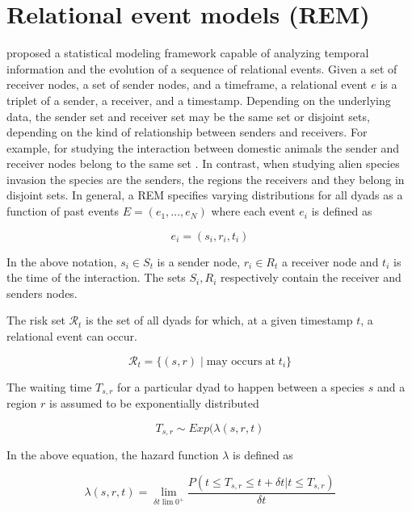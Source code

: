 \documentclass[mscthesis]{usiinfthesis}
\begin{document}
\section{Relational event models (REM)}
\label{background:rem}

\citet{rem:butts} proposed a statistical modeling framework capable of analyzing temporal information and the evolution of a sequence of relational events. Given a set of receiver nodes, a set of sender nodes, and a timeframe, a relational event $e$ is a triplet of a sender, a receiver, and a timestamp. Depending on the underlying data, the sender set and receiver set may be the same set or disjoint sets, depending on the kind of relationship between senders and receivers. For example, for studying the interaction between domestic animals the sender and receiver nodes belong to the same set \cite{intro:cattle}. In contrast, when studying alien species invasion the species are the senders, the regions the receivers and they belong in disjoint sets. In general, a REM specifies varying distributions for all dyads as a function of past events $E=(e_1, ..., e_N)$ where each event $e_i$ is defined as

\[
e_i = (s_i, r_i, t_i)
\]

In the above notation, $s_i \in S_{t} $ is a sender node, $r_i \in R_{t}$ a receiver node and $t_i$ is the time of the interaction. The sets $S_i, R_i$ respectively contain the receiver and senders nodes.

%

The risk set $\mathcal{R}_t$ is the set of all dyads for which, at a given timestamp $t$, a relational event can occur.

\[
\mathcal{R}_{t} = \{(s,r) \; | \; \textrm{may occurs} \; \textrm{at} \; t_i\}
\]

The waiting time $T_{s,r}$ for a particular dyad to happen between a species $s$ and a region $r$ is assumed to be exponentially distributed 

\[
T_{s,r} \sim Exp(\lambda(s, r, t)
\]


In the above equation, the hazard function $\lambda$ is defined as

\[
\lambda(s, r, t) = \lim_{\delta t \lim 0^+} \frac{P(t \leq T_{s,r} \leq t + \delta t | t \leq T_{s,r})}{\delta t}
\]
\end{document}
